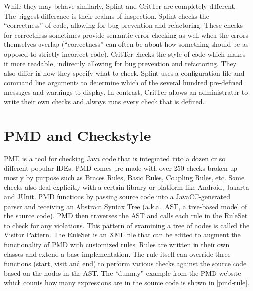 \documentclass[12pt]{report}
\newcommand{\programName}{CritTer\xspace}
\begin{document}
While they may behave similarly, Splint and \programName are completely different. The biggest 
difference is their realms of inspection. Splint checks the ``correctness'' of code, allowing for bug 
prevention and refactoring. These checks for correctness sometimes provide semantic error checking as 
well when the errors themselves overlap (``correctness'' can often be about how something should be as 
opposed to strictly incorrect code). \programName checks the style of code which makes it more
readable, indirectly allowing for bug prevention and refactoring. They also differ in how they specify what 
to check. Splint uses a configuration file and command line arguments to determine which of the several 
hundred pre-defined messages and warnings to display. In contrast, \programName allows an 
administrator to write their own checks and always runs every check that is defined.

\section{PMD and Checkstyle}
\label{sec:pmdAndCheckstyle}

PMD is a tool for checking Java code that is integrated into a dozen or so different popular IDEs.
PMD comes pre-made with over 250 checks broken up mostly by purpose such as Braces Rules, 
Basic Rules, Coupling Rules, etc. Some checks also deal explicitly with a certain 
library or platform like Android, Jakarta and JUnit. PMD functions by passing source code into a 
JavaCC-generated parser and receiving an Abstract Syntax Tree (a.k.a.\ AST, a tree-based model of 
the source code). PMD then traverses the AST and calls each rule in the RuleSet to check for any
violations. This pattern of examining a tree of nodes is called the Visitor Pattern\cite{design-patterns}. 
The RuleSet is an XML file that can be edited to augment the functionality of PMD with customized 
rules. Rules are written in their own classes and extend a base implementation. The rule itself can 
override three functions (start, visit and end) to perform various checks against the source code based 
on the nodes in the AST. The ``dummy'' example from the PMD website which counts how 
many expressions are in the source code is shown in \autoref{pmd-rule}.
\end{document}
